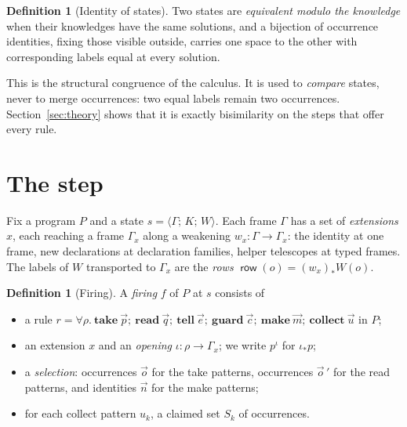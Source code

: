 \documentclass[11pt]{article}
\theoremstyle{plain}
\theoremstyle{definition}
\newtheorem{definition}[theorem]{Definition}
\theoremstyle{remark}
\newcommand{\st}[3]{\langle #1;\,#2;\,#3\rangle}
\newcommand{\op}[1]{\operatorname{\mathsf{#1}}}
\newcommand{\kw}[1]{\mathbf{#1}}
\newcommand{\row}{\op{row}}
\begin{document}
\begin{definition}[Identity of states]\label{def:identity}
Two states are \emph{equivalent modulo the knowledge} when their knowledges have the same
solutions, and a bijection of occurrence identities, fixing those visible outside, carries one
space to the other with corresponding labels equal at every solution.
\end{definition}

This is the structural congruence of the calculus. It is used to \emph{compare} states, never to
merge occurrences: two equal labels remain two occurrences. Section~\ref{sec:theory} shows that it
is exactly bisimilarity on the steps that offer every rule.

\section{The step}\label{sec:step}

Fix a program $P$ and a state $s=\st{\Gamma}{K}{W}$. Each frame $\Gamma$ has a set of
\emph{extensions} $x$, each reaching a frame $\Gamma_x$ along a weakening $w_x:\Gamma\to\Gamma_x$:
the identity at one frame, new declarations at declaration families, helper telescopes at typed
frames. The labels of $W$ transported to $\Gamma_x$ are the \emph{rows}
$\row(o)=(w_x)_*W(o)$.

\begin{definition}[Firing]\label{def:firing}
A \emph{firing} $f$ of $P$ at $s$ consists of
\begin{itemize}
\item a rule $r=\forall\rho.\ \kw{take}\ \vec p;\ \kw{read}\ \vec q;\ \kw{tell}\ \vec e;\
  \kw{guard}\ \vec c;\ \kw{make}\ \vec m;\ \kw{collect}\ \vec u$ in $P$;
\item an extension $x$ and an \emph{opening} $\iota:\rho\to\Gamma_x$; we write $p^\iota$ for
  $\iota_*p$;
\item a \emph{selection}: occurrences $\vec o$ for the take patterns, occurrences $\vec o\,'$ for
  the read patterns, and identities $\vec n$ for the make patterns;
\item for each collect pattern $u_k$, a claimed set $S_k$ of occurrences.
\end{itemize}
\end{definition}
\end{document}
